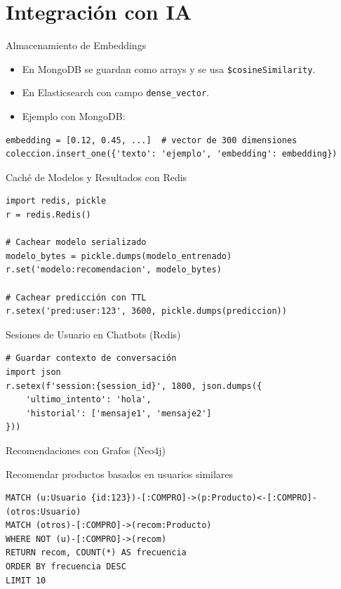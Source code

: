 \documentclass[aspectratio=169, 10pt, xcolor=table]{beamer}
\begin{document}
\section{Integración con IA}

\begin{frame}[fragile]{Almacenamiento de Embeddings}
    \begin{itemize}
        \item En MongoDB se guardan como arrays y se usa \texttt{\$cosineSimilarity}.
        \item En Elasticsearch con campo \texttt{dense\_vector}.
        \item Ejemplo con MongoDB:
    \end{itemize}
    \begin{lstlisting}[style=python]
embedding = [0.12, 0.45, ...]  # vector de 300 dimensiones
coleccion.insert_one({'texto': 'ejemplo', 'embedding': embedding})
    \end{lstlisting}
\end{frame}

\begin{frame}[fragile]{Caché de Modelos y Resultados con Redis}
    \begin{lstlisting}[style=python]
import redis, pickle
r = redis.Redis()

# Cachear modelo serializado
modelo_bytes = pickle.dumps(modelo_entrenado)
r.set('modelo:recomendacion', modelo_bytes)

# Cachear predicción con TTL
r.setex('pred:user:123', 3600, pickle.dumps(prediccion))
    \end{lstlisting}
\end{frame}

\begin{frame}[fragile]{Sesiones de Usuario en Chatbots (Redis)}
    \begin{lstlisting}[style=python]
# Guardar contexto de conversación
import json
r.setex(f'session:{session_id}', 1800, json.dumps({
    'ultimo_intento': 'hola',
    'historial': ['mensaje1', 'mensaje2']
}))
    \end{lstlisting}
\end{frame}

\begin{frame}[fragile]{Recomendaciones con Grafos (Neo4j)}
    \begin{block}{Recomendar productos basados en usuarios similares}
        \begin{lstlisting}
MATCH (u:Usuario {id:123})-[:COMPRO]->(p:Producto)<-[:COMPRO]-(otros:Usuario)
MATCH (otros)-[:COMPRO]->(recom:Producto)
WHERE NOT (u)-[:COMPRO]->(recom)
RETURN recom, COUNT(*) AS frecuencia
ORDER BY frecuencia DESC
LIMIT 10
        \end{lstlisting}
    \end{block}
\end{frame}
\end{document}
